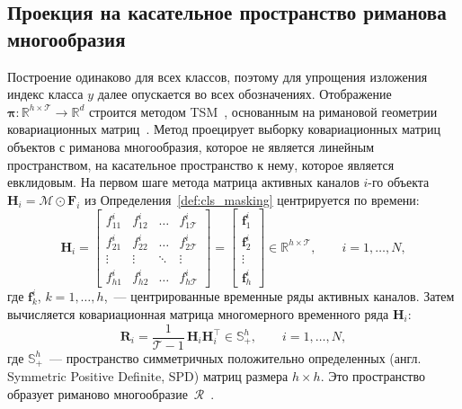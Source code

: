 \subsection{Проекция на касательное пространство риманова многообразия}\label{sec3:cls_tsm}
Построение одинаково для всех классов, поэтому для упрощения изложения индекс класса $y$ далее опускается во всех обозначениях. Отображение $\boldsymbol{\pi}: \mathbb{R}^{h \times \mathcal{T}} \to \mathbb{R}^{d}$ строится методом TSM~\cite{barachant2011multiclass}, основанным на римановой геометрии ковариационных матриц~\cite{barachant2010riemannian, barachant2011multiclass}. Метод проецирует выборку ковариационных матриц объектов с риманова многообразия, которое не является линейным пространством, на касательное пространство к нему, которое является евклидовым. На первом шаге метода матрица активных каналов $i$-го объекта $\mathbf{H}_i = \mathcal{M} \odot \mathbf{F}_i$ из Определения~\ref{def:cls_masking} центрируется по времени:
\begin{equation*}
\mathbf{H}_i = \left[
\begin{array}{cccc}
f^{i}_{11} & f^{i}_{12} & \ldots & f^{i}_{1\mathcal{T}}\\
f^{i}_{21} & f^{i}_{22} & \ldots & f^{i}_{2\mathcal{T}}\\
\vdots & \vdots & \ddots & \vdots\\
f^{i}_{h1} & f^{i}_{h2} & \ldots & f^{i}_{h\mathcal{T}}
\end{array}
\right]
= \begin{bmatrix}
\mathbf{f}^{i}_1\\
\mathbf{f}^{i}_2\\
\vdots\\
\mathbf{f}^{i}_{h}
\end{bmatrix} \in \mathbb{R}^{h \times \mathcal{T}}, \qquad i = 1, \ldots, N,
\end{equation*}
где $\mathbf{f}^{i}_k$, $k = 1, \ldots, h$,~--- центрированные временные ряды активных каналов. Затем вычисляется ковариационная матрица многомерного временного ряда $\mathbf{H}_i$:
\begin{equation}\label{eq:cls_cov}
\mathbf{R}_i = \frac{1}{\mathcal{T}-1}\, \mathbf{H}_i \mathbf{H}_i^{\top} \in \mathbb{S}_{+}^{h}, \qquad i = 1, \ldots, N,
\end{equation}
где $\mathbb{S}_{+}^{h}$~--- пространство симметричных положительно определенных (англ. Symmetric Positive Definite, SPD) матриц размера $h \times h$. Это пространство образует риманово многообразие~$\mathcal{R}$~\cite{barachant2010riemannian}.

